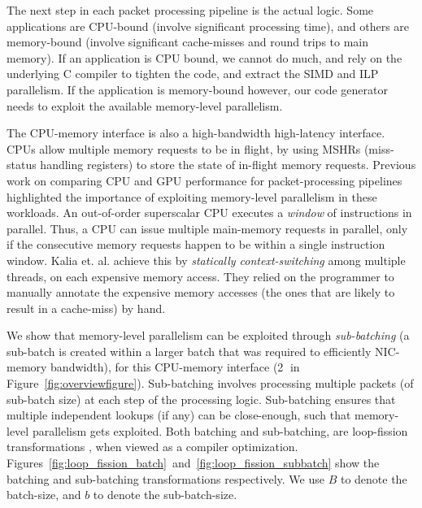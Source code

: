 The next step in each packet processing pipeline is the actual logic.
Some applications are CPU-bound (involve
significant processing time), and others are memory-bound (involve significant cache-misses
and round trips to main memory). If an application is CPU bound, we cannot do much, and rely
on the underlying C compiler to tighten the code, and extract the SIMD and ILP parallelism. If
the application is memory-bound however, our code generator needs to exploit the
available memory-level parallelism.

The CPU-memory interface is also a high-bandwidth high-latency interface. CPUs allow multiple
memory requests to be in flight, by using MSHRs (miss-status handling registers) to store the
state of in-flight memory requests. Previous work on comparing CPU and GPU performance for
packet-processing pipelines \cite{189006} highlighted the importance of exploiting
memory-level parallelism in these workloads.
An out-of-order superscalar CPU executes a {\em window} of instructions in parallel.
Thus, a CPU can issue multiple main-memory requests in parallel, only if the consecutive memory
requests happen to be within a single instruction window. Kalia et. al. \cite{189006}
achieve this by {\em statically context-switching} among multiple threads, on each
expensive memory access. They relied on the programmer to manually annotate the expensive
memory accesses (the ones that are likely to result in a cache-miss) by hand.

We show that memory-level parallelism can be exploited through {\em sub-batching} (a sub-batch
is created within a larger batch that was required to efficiently NIC-memory bandwidth), for this
CPU-memory interface (\textcircled{2} in Figure~\ref{fig:overviewfigure}). Sub-batching
involves processing multiple packets (of sub-batch size) at
each step of the processing logic.
Sub-batching ensures that multiple independent lookups (if any) can be close-enough, such that
memory-level parallelism gets exploited.
Both batching and sub-batching, are
loop-fission transformations \cite{loop_fission}, when viewed as a compiler optimization.
Figures~\ref{fig:loop_fission_batch}~and~\ref{fig:loop_fission_subbatch} show
the batching and sub-batching transformations respectively. We use $B$
to denote the batch-size, and $b$ to denote the sub-batch-size.


